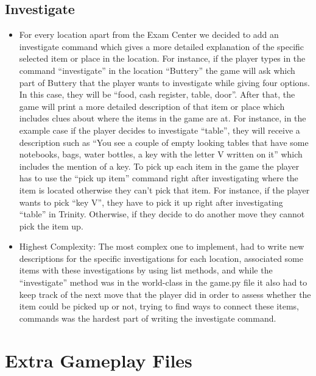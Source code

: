 \documentclass[11pt]{article}
\begin{document}
\begin{enumerate}
\subsection*{Investigate}
\begin{itemize}
    \item For every location apart from the Exam Center we decided to add an investigate command which gives a more detailed explanation of the specific selected item or place in the location. For instance, if the player types in the command “investigate” in the location “Buttery” the game will ask which part of Buttery that the player wants to investigate while giving four options. In this case, they will be “food, cash register, table, door”.  After that, the game will print a more detailed description of that item or place which includes clues about where the items in the game are at. For instance, in the example case if the player decides to investigate “table”, they will receive a description such as “You see a couple of empty looking tables that have some notebooks, bags, water bottles, a key with the letter V written on it” which includes the mention of a key. To pick up each item in the game the player has to use the “pick up {item}” command right after investigating where the item is located otherwise they can’t pick that item. For instance, if the player wants to pick “key V”, they have to pick it up right after investigating “table” in Trinity. Otherwise, if they decide to do another move they cannot pick the item up. 
    \item Highest Complexity: The most complex one to implement, had to write new descriptions for the specific investigations for each location, associated some items with these investigations by using list methods, and while the “investigate” method was in the world-class in the game.py file it also had to keep track of the next move that the player did in order to assess whether the item could be picked up or not, trying to find ways to connect these items, commands was the hardest part of writing the investigate command.
\end{itemize}

\end{enumerate}


\section*{Extra Gameplay Files}
\end{document}
